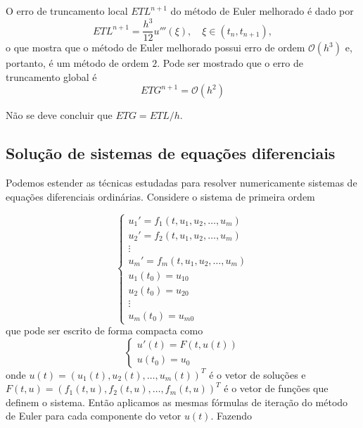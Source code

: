\documentclass{article}
\begin{document}
O erro de truncamento local \(ETL^{n+1}\) do método de Euler melhorado é dado por
\begin{equation}
    ETL^{n+1} = \frac{h^3}{12} u'''(\xi), \quad \xi \in (t_n, t_{n+1}),
\end{equation}
o que mostra que o método de Euler melhorado possui erro de ordem \(\mathcal{O}(h^3)\) e, portanto, é um método de ordem \(2\). Pode ser mostrado que o erro de truncamento global é
\begin{equation}
    ETG^{n+1} = \mathcal{O}(h^2)
\end{equation}

\begin{rem}
    Não se deve concluir que \(ETG = ETL/h\).
\end{rem}

\subsection{Solução de sistemas de equações diferenciais}

Podemos estender as técnicas estudadas para resolver numericamente sistemas de equações diferenciais ordinárias. Considere o sistema de primeira ordem

\begin{equation}
    \begin{cases}
        u_1' = f_1(t, u_1, u_2, \ldots, u_m) \\
        u_2' = f_2(t, u_1, u_2, \ldots, u_m) \\
        \vdots \\
        u_m' = f_m(t, u_1, u_2, \ldots, u_m) \\
        u_1(t_0) = u_{10} \\
        u_2(t_0) = u_{20} \\
        \vdots \\
        u_m(t_0) = u_{m0}
    \end{cases}
\end{equation}
que pode ser escrito de forma compacta como
\begin{equation}
    \begin{cases}
        u'(t) = F(t, u(t)) \\
        u(t_0) = u_0
    \end{cases}
\end{equation}
onde \(u(t) = (u_1(t), u_2(t), \ldots, u_m(t))^T\) é o vetor de soluções e \(F(t, u) = (f_1(t, u), f_2(t, u), \ldots, f_m(t, u))^T\) é o vetor de funções que definem o sistema. Então aplicamos as mesmas fórmulas de iteração do método de Euler para cada componente do vetor \(u(t)\). Fazendo
\end{document}
